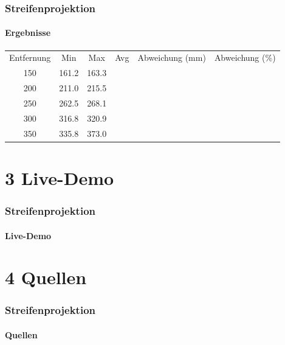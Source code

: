 \documentclass{beamer}
\begin{document}
\begin{frame}
	\frametitle{Streifenprojektion}
	\framesubtitle{Ergebnisse}

	\begin{tabular}{c|c|c|c|c|c}
		Entfernung & Min & Max & Avg & Abweichung (mm) & Abweichung (\%)\\
		150 & 161.2 & 163.3\\
		200 & 211.0 & 215.5\\
		250 & 262.5 & 268.1\\
		300 & 316.8 & 320.9\\
		350 & 335.8 & 373.0
	\end{tabular}

\end{frame}


\section{3 \hspace{5px} Live-Demo} 
\begin{frame}
	\frametitle{Streifenprojektion}
	\framesubtitle{Live-Demo}

\end{frame}


\section{4 \hspace{5px} Quellen} 
\begin{frame}
	\frametitle{Streifenprojektion}
	\framesubtitle{Quellen}
	
\end{frame}
\end{document}
